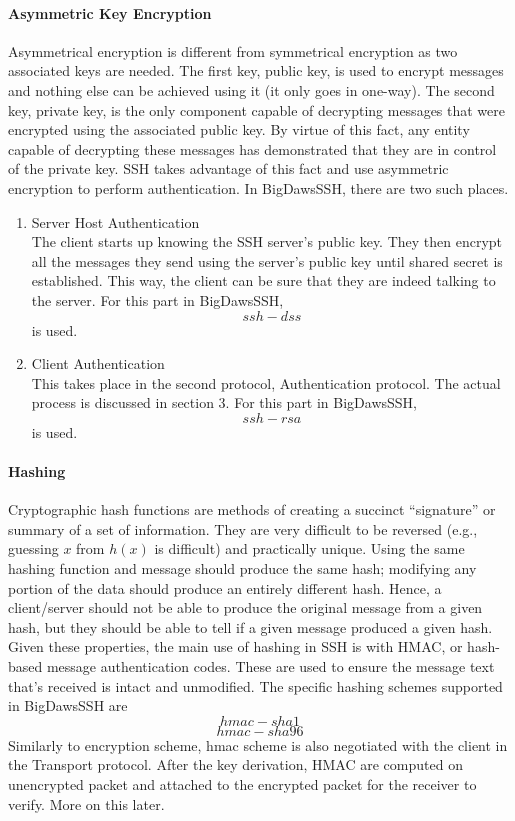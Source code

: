 \documentclass[10pt,sigconf]{acmart}
\begin{document}
\paragraph{\textbf{Asymmetric Key Encryption}}
Asymmetrical encryption is different from symmetrical encryption as two associated keys are needed. The first key, public key, is used to encrypt messages and nothing else can be achieved using it (it only goes in one-way). The second key, private key, is the only component capable of decrypting messages that were encrypted using the associated public key. By virtue of this fact, any entity capable of decrypting these messages has demonstrated that they are in control of the private key. SSH takes advantage of this fact and use asymmetric encryption to perform authentication. In BigDawsSSH, there are two such places. 
\begin{enumerate}
  \item Server Host Authentication\\
  The client starts up knowing the SSH server's public key. They then encrypt all the messages they send using the server's public key until shared secret is established. This way, the client can be sure that they are indeed talking to the server. For this part in BigDawsSSH, \[ssh-dss\] is used.
  \item Client Authentication\\
  This takes place in the second protocol, Authentication protocol. The actual process is discussed in section 3. For this part in BigDawsSSH, \[ssh-rsa\] is used.
\end{enumerate}
\paragraph{\textbf{Hashing}} Cryptographic hash functions are methods of creating a succinct “signature” or summary of a set of information. They are very difficult to be reversed (e.g., guessing $x$ from $h(x)$ is difficult) and practically unique. Using the same hashing function and message should produce the same hash; modifying any portion of the data should produce an entirely different hash. Hence, a client/server should not be able to produce the original message from a given hash, but they should be able to tell if a given message produced a given hash. Given these properties, the main use of hashing in SSH is with HMAC, or hash-based message authentication codes. These are used to ensure the message text that's received is intact and unmodified. The specific hashing schemes supported in BigDawsSSH are \[hmac-sha1\]\[hmac-sha96\]
Similarly to encryption scheme, hmac scheme is also negotiated with the client in the Transport protocol. After the key derivation, HMAC are computed on unencrypted packet and attached to the encrypted packet for the receiver to verify. More on this later.
\end{document}
